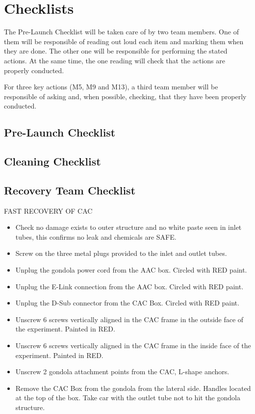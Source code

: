 \newpage
\section{Checklists}\label{sec:Checklist}


The Pre-Launch Checklist will be taken care of by two team members. One of them will be responsible of reading out loud each item and marking them when they are done. The other one will be responsible for performing the stated actions. At the same time, the one reading will check that the actions are properly conducted. 

For three key actions (M5, M9 and M13), a third team member will be responsible of asking and, when possible, checking, that they have been properly conducted. 

\subsection{Pre-Launch Checklist}\label{sec:appL}

\subsection{Cleaning Checklist}


\subsection{Recovery Team Checklist}\label{ssec:RecoveryCheck}

FAST RECOVERY OF CAC

\begin{itemize}
    \item Check no damage exists to outer structure and no white paste seen in inlet tubes, this confirms no leak and chemicals are SAFE.
    \item Screw on the three metal plugs provided to the inlet and outlet tubes.
    \item Unplug the gondola power cord from the AAC box. Circled with RED paint.
    \item Unplug the E-Link connection from the AAC box. Circled with RED paint.
    \item Unplug the D-Sub connector from the CAC Box. Circled with RED paint.
    \item Unscrew 6 screws vertically aligned in the CAC frame in the outside face of the experiment. Painted in RED.
    \item Unscrew 6 screws vertically aligned in the CAC frame in the inside face of the experiment. Painted in RED.
    \item Unscrew 2 gondola attachment points from the CAC, L-shape anchors. 
    \item Remove the CAC Box from the gondola from the lateral side. Handles located at the top of the box. Take car with the outlet tube not to hit the gondola structure.
\end{itemize}

